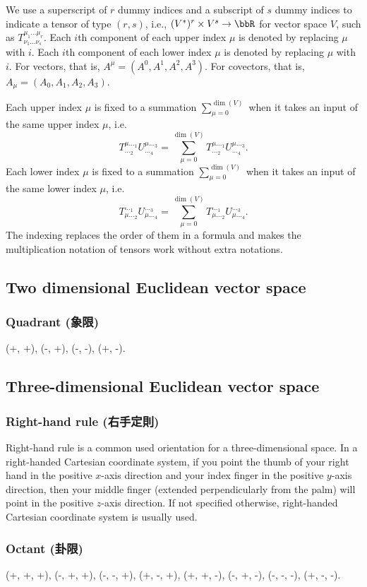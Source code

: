 \documentclass[a4paper,12pt]{report}
\begin{document}
We use a superscript of $r$ dummy indices and a subscript of $s$ dummy indices to indicate a tensor of type $(r,s)$, i.e., $(V^*)^r\times V^s\to\bbR$ for vector space $V$, such as $T^{\mu_1\ldots\mu_r}_{\nu_1\ldots\nu_s}$. Each $i$th component of each upper index $\mu$ is denoted by replacing $\mu$ with $i$. Each $i$th component of each lower index $\mu$ is denoted by replacing $\mu$ with $i$. For vectors, that is, $A^{\mu}=(A^0,A^1,A^2,A^3)$. For covectors, that is, $A_{\mu}=(A_0,A_1,A_2,A_3)$.

Each upper index $\mu$ is fixed to a summation $\sum_{\mu=0}^{\dim(V)}$ when it takes an input of the same upper index $\mu$, i.e.
\[T^{\mu\ldots_1}_{\ldots_2}U^{\mu\ldots_3}_{\ldots_4}=\sum_{\mu=0}^{\dim(V)}T^{\mu\ldots_1}_{\ldots_2}U^{\mu\ldots_3}_{\ldots_4}.\]
Each lower index $\mu$ is fixed to a summation $\sum_{\mu=0}^{\dim(V)}$ when it takes an input of the same lower index $\mu$, i.e.
\[T^{\ldots_1}_{\mu\ldots_2}U^{\ldots_3}_{\mu\ldots_4}=\sum_{\mu=0}^{\dim(V)}T^{\ldots_1}_{\mu\ldots_2}U^{\ldots_3}_{\mu\ldots_4}.\]
The indexing replaces the order of them in a formula and makes the multiplication notation of tensors work without extra notations.
\subsection{Two dimensional Euclidean vector space}
\subsubsection{Quadrant (象限)}
(+, +), (-, +), (-, -), (+, -).
\subsection{Three-dimensional Euclidean vector space}
\subsubsection{Right-hand rule (右手定則)}
Right-hand rule is a common used orientation for a three-dimensional space. In a right-handed Cartesian coordinate system, if you point the thumb of your right hand in the positive $x$-axis direction and your index finger in the positive $y$-axis direction, then your middle finger (extended perpendicularly from the palm) will point in the positive $z$-axis direction. If not specified otherwise, right-handed Cartesian coordinate system is usually used.
\subsubsection{Octant (卦限)}
(+, +, +), (-, +, +), (-, -, +), (+, -, +), (+, +, -), (-, +, -), (-, -, -), (+, -, -).
\end{document}
